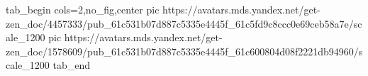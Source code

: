  
 
 
 
 

\ifcmt
  tab_begin cols=2,no_fig,center
     pic https://avatars.mds.yandex.net/get-zen_doc/4457333/pub_61c531b07d887c5335e4445f_61c5fd9c8ccc0e69ceb58a7e/scale_1200
		 pic https://avatars.mds.yandex.net/get-zen_doc/1578609/pub_61c531b07d887c5335e4445f_61c600804d08f2221db94960/scale_1200
  tab_end
\fi

